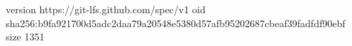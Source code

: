 version https://git-lfs.github.com/spec/v1
oid sha256:b9fa921700d5adc2daa79a20548e5380d57afb95202687cbeaf39fadfdf90ebf
size 1351

